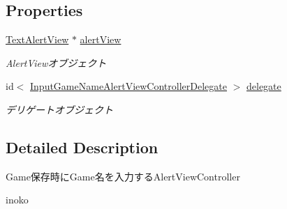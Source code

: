 \subsection*{Properties}
\begin{DoxyCompactItemize}
\item 
\hypertarget{interface_input_game_name_alert_view_controller_a52fbdb41ee5debef2ec0921c59cb0bb8}{
\hyperlink{interface_text_alert_view}{TextAlertView} $\ast$ \hyperlink{interface_input_game_name_alert_view_controller_a52fbdb41ee5debef2ec0921c59cb0bb8}{alertView}}
\label{interface_input_game_name_alert_view_controller_a52fbdb41ee5debef2ec0921c59cb0bb8}

\begin{DoxyCompactList}\small\item\em AlertViewオブジェクト \end{DoxyCompactList}\item 
\hypertarget{interface_input_game_name_alert_view_controller_a5a40d10761f481dceb435da7f3590e03}{
id$<$ \hyperlink{protocol_input_game_name_alert_view_controller_delegate-p}{InputGameNameAlertViewControllerDelegate} $>$ \hyperlink{interface_input_game_name_alert_view_controller_a5a40d10761f481dceb435da7f3590e03}{delegate}}
\label{interface_input_game_name_alert_view_controller_a5a40d10761f481dceb435da7f3590e03}

\begin{DoxyCompactList}\small\item\em デリゲートオブジェクト \end{DoxyCompactList}\end{DoxyCompactItemize}


\subsection{Detailed Description}
Game保存時にGame名を入力するAlertViewController

inoko 

